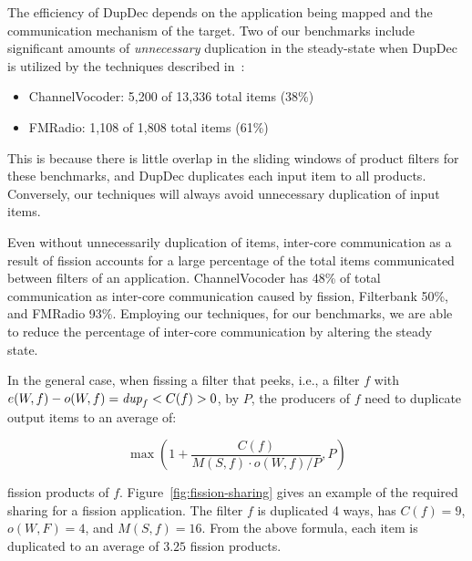 The efficiency of DupDec depends on the application being mapped and
the communication mechanism of the target.  Two of our benchmarks
include significant amounts of {\it unnecessary} duplication in the
steady-state when DupDec is utilized by the techniques described
in~\cite{gordon-asplos06}:

\begin{itemize}
\item ChannelVocoder: 5,200 of 13,336 total items (38\%)
\item FMRadio: 1,108 of 1,808 total items (61\%) 
\end{itemize}

This is because there is little overlap in the sliding windows of
product filters for these benchmarks, and DupDec duplicates each input
item to all products. Conversely, our techniques will always avoid
unnecessary duplication of input items.

Even without unnecessarily duplication of items, inter-core
communication as a result of fission accounts for a large percentage
of the total items communicated between filters of an application.
ChannelVocoder has 48\% of total communication as inter-core
communication caused by fission, Filterbank 50\%, and FMRadio 93\%.
Employing our techniques, for our benchmarks, we are able to reduce
the percentage of inter-core communication by altering the steady
state.

In the general case, when fissing a filter that peeks, i.e., a filter
$f$ with $e(W, f) - o(W, f) = \mbox{\it dup}_f < C(f) > 0$, by $P$, the producers
of $f$ need to duplicate output items to an average of:

\[ \max \left ( 1 + \frac{C(f)}{M(S, f) \cdot o(W, f) / P}, P \right )\]

\noindent fission products of $f$.  Figure~\ref{fig:fission-sharing}
gives an example of the required sharing for a fission application.
The filter $f$ is duplicated 4 ways, has $C(f) = 9$, $o(W, F) = 4$,
and $M(S, f) = 16$.  From the above formula, each item is duplicated
to an average of $3.25$ fission products.

